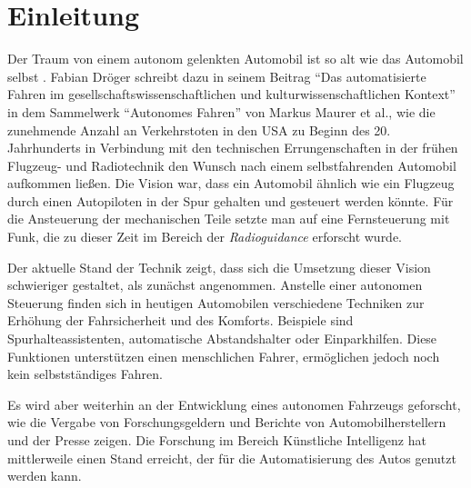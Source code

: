 \chapter{Einleitung}
\label{cha:Einleitung}
\setlength{\epigraphwidth}{4in}

Der Traum von einem autonom gelenkten Automobil ist so alt wie das Automobil selbst \cite{maurer_autonomes_2015}. Fabian Dröger schreibt dazu in seinem Beitrag "`Das automatisierte Fahren im gesellschaftswissenschaftlichen und kulturwissenschaftlichen Kontext"' in dem Sammelwerk "`Autonomes Fahren"' von Markus Maurer et al., wie die zunehmende Anzahl an Verkehrstoten in den USA zu Beginn des 20. Jahrhunderts in Verbindung mit den technischen Errungenschaften in der frühen Flugzeug- und Radiotechnik den Wunsch nach einem selbstfahrenden Automobil aufkommen ließen. Die Vision war, dass ein Automobil ähnlich wie ein Flugzeug durch einen Autopiloten in der Spur gehalten und gesteuert werden könnte. Für die Ansteuerung der mechanischen Teile setzte man auf eine Fernsteuerung mit Funk, die zu dieser Zeit im Bereich der \emph{Radioguidance} erforscht wurde.

Der aktuelle Stand der Technik zeigt, dass sich die Umsetzung dieser Vision schwieriger gestaltet, als zunächst angenommen. Anstelle einer autonomen Steuerung finden sich in heutigen Automobilen verschiedene Techniken zur Erhöhung der Fahrsicherheit und des Komforts. Beispiele sind Spurhalteassistenten, automatische Abstandshalter oder Einparkhilfen. Diese Funktionen unterstützen einen menschlichen Fahrer, ermöglichen jedoch noch kein selbstständiges Fahren.

Es wird aber weiterhin an der Entwicklung eines autonomen Fahrzeugs geforscht, wie die Vergabe von Forschungsgeldern\cite{bmbf-internetredaktion_auto_nodate} und Berichte von Automobilherstellern\cite{bmw_autonomes_nodate} und der Presse\cite{efler_autonomes_2018} zeigen. Die Forschung im Bereich Künstliche Intelligenz hat mittlerweile einen Stand erreicht, der für die Automatisierung des Autos genutzt werden kann.   


